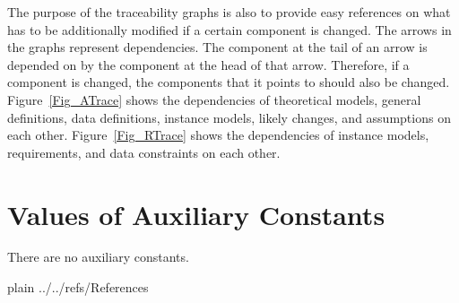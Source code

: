\documentclass[12pt]{article}
\newcommand{\iref}[1]{IM\ref{#1}}
\newcommand{\ddref}[1]{DD\ref{#1}}
\begin{document}

The purpose of the traceability graphs is also to provide easy references on
what has to be additionally modified if a certain component is changed.  The
arrows in the graphs represent dependencies. The component at the tail of an
arrow is depended on by the component at the head of that arrow. Therefore, if a
component is changed, the components that it points to should also be
changed. Figure~\ref{Fig_ATrace} shows the dependencies of theoretical models,
general definitions, data definitions, instance models, likely changes, and
assumptions on each other. Figure~\ref{Fig_RTrace} shows the dependencies of
instance models, requirements, and data constraints on each other.

\section{Values of Auxiliary Constants}
There are no auxiliary constants.


\newpage

 {plain}
 {../../refs/References}
\end{document}
